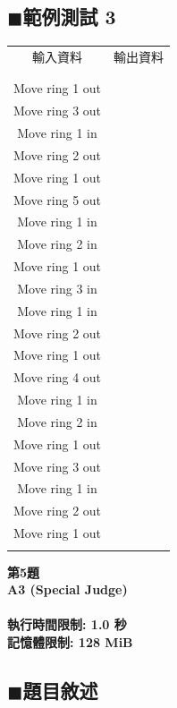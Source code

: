 \documentclass[12pt,a4paper]{article}
\begin{document}
\subsection*{$\blacksquare$範例測試 3}
\begin{tabular}{cc}
輸入資料&輸出資料\\ 
\framebox{\begin{minipage}{0.45\linewidth}
\texttt{5\\
}
\end{minipage}}
&
\framebox{\begin{minipage}{0.45\linewidth}
\texttt{21\\
Move ring 1 out\\
Move ring 3 out\\
Move ring 1 in\\
Move ring 2 out\\
Move ring 1 out\\
Move ring 5 out\\
Move ring 1 in\\
Move ring 2 in\\
Move ring 1 out\\
Move ring 3 in\\
Move ring 1 in\\
Move ring 2 out\\
Move ring 1 out\\
Move ring 4 out\\
Move ring 1 in\\
Move ring 2 in\\
Move ring 1 out\\
Move ring 3 out\\
Move ring 1 in\\
Move ring 2 out\\
Move ring 1 out\\
}\end{minipage}}\\ 
\end{tabular}


\newpage


\begin{center}
\textbf{{\Huge 第5題\\A3 (Special Judge)\\}~\\執行時間限制: 1.0 秒\\記憶體限制: 128 MiB}
\end{center}


\subsection*{$\blacksquare$題目敘述}
\end{document}
